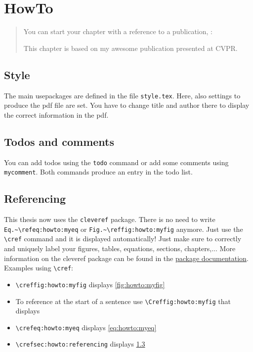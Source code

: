 \documentclass[../PhD_main.tex]{subfiles}
\begin{document}
\newcommand{\textcommand}[2]{\textbackslash{#1}\textbraceleft #2\textbraceright}


\chapter{HowTo}
\label{chap:howto}


\begin{quote}
	You can start your chapter with a reference to a publication, \eg:
	
	This chapter is based on my awesome publication presented at CVPR.
	
\end{quote}

\minitoc

\section{Style}
\label{sec:howto:intro_contributions}
The main usepackages are defined in the file \texttt{style.tex}. Here, also settings to produce the pdf file are set. You have to change title and author there to display the correct information in the pdf.

\section{Todos and comments}
You can add todos using the \texttt{todo} command  or add some comments using \texttt{mycomment}. Both commands produce an entry in the todo list.

\section{Referencing}
\label{sec:howto:referencing}
This thesis now uses the \texttt{cleveref} package. There is no need to write \texttt{Eq.\textasciitilde\textcommand{ref}{eq:howto:myeq}} or \texttt{Fig.\textasciitilde \textcommand{ref}{fig:howto:myfig}} anymore.
Just use the \texttt{\textbackslash{cref}} command and it is displayed automatically!
Just make sure to correctly and uniquely label your figures, tables, equations, sections, chapters,...
More information on the cleveref package can be found in the \href{http://tug.ctan.org/tex-archive/macros/latex/contrib/cleveref/cleveref.pdf}{package documentation}.
\\

\noindent Examples using \texttt{\textbackslash{cref}}:
\begin{itemize}
	\item \texttt{\textcommand{cref}{fig:howto:myfig}} displays \cref{fig:howto:myfig}
	\item To reference at the start of a sentence use \texttt{\textcommand{Cref}{fig:howto:myfig}} that displays 
	\item \texttt{\textcommand{cref}{eq:howto:myeq}} displays \cref{eq:howto:myeq}
	\item \texttt{\textcommand{cref}{sec:howto:referencing}} displays \cref{sec:howto:referencing}
\end{itemize}
\end{document}
